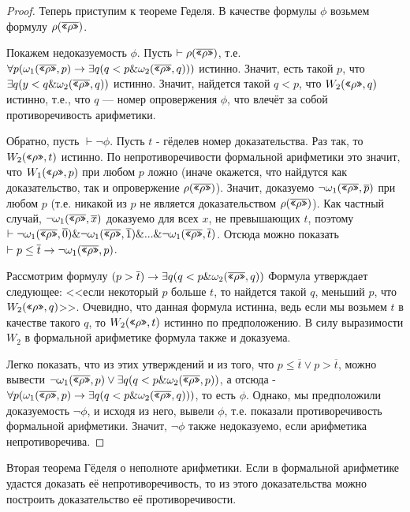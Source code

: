 \begin{proof}
Теперь приступим к теореме Геделя.
В качестве формулы $\phi$ возьмем формулу $\rho(\overline{\texttt{<<}\rho\texttt{>>}})$.

Покажем недоказуемость $\phi$. Пусть $\vdash \rho(\overline{\texttt{<<}\rho\texttt{>>}})$, 
т.е. $\forall p (\omega_1 (\overline{\texttt{<<}\rho\texttt{>>}},p) \rightarrow \exists q (q < p \& \omega_2 (\overline{\texttt{<<}\rho\texttt{>>}},q)))$
истинно. Значит, есть такой $p$, что $\exists q (y < q \& \omega_2 (\overline{\texttt{<<}\rho\texttt{>>}},q))$ истинно.
Значит, найдется такой $q < p$, что $W_2 (\texttt{<<}\rho\texttt{>>},q)$ истинно, т.е., что 
$q$ --- номер опровержения $\phi$, что влечёт за собой противоречивость арифметики.

Обратно, пусть $\vdash \neg \phi$. Пусть $t$ - гёделев номер доказательства.
Раз так, то $W_2 (\texttt{<<}\rho\texttt{>>},t)$ истинно. По непротиворечивости формальной арифметики
это значит, что $W_1 (\texttt{<<}\rho\texttt{>>},p)$ при любом $p$ ложно (иначе окажется, что 
найдутся как доказательство, так и опровержение $\rho(\overline{\texttt{<<}\rho\texttt{>>}})$). 
Значит, доказуемо $\neg \omega_1 (\overline{\texttt{<<}\rho\texttt{>>}},\overline{p})$ при 
любом $p$ (т.е. никакой из $p$ не является доказательством $\rho(\overline{\texttt{<<}\rho\texttt{>>}})$). 
Как частный случай, $\neg \omega_1 (\overline{\texttt{<<}\rho\texttt{>>}},\overline{x})$ доказуемо для
всех $x$, не превышающих $t$, поэтому 
$\vdash \neg \omega_1 (\overline{\texttt{<<}\rho\texttt{>>}},\overline{0}) \& \neg \omega_1 (\overline{\texttt{<<}\rho\texttt{>>}},\overline{1}) \& ... \& \neg \omega_1 (\overline{\texttt{<<}\rho\texttt{>>}},\overline{t})$.
Отсюда можно показать $\vdash p \le \overline{t} \rightarrow \neg \omega_1 (\overline{\texttt{<<}\rho\texttt{>>}},p)$.

Рассмотрим формулу $(p > \overline{t}) \rightarrow \exists q (q < p \& \omega_2 (\overline{\texttt{<<}\rho\texttt{>>}},q))$
Формула утверждает следующее: <<если некоторый $p$ больше $t$, то найдется
такой $q$, меньший $p$, что $W_2 (\texttt{<<}\rho\texttt{>>},q)$>>. Очевидно, что данная формула истинна,
ведь если мы возьмем $t$ в качестве такого $q$, то $W_2 (\texttt{<<}\rho\texttt{>>},t)$ истинно 
по предположению. В силу выразимости $W_2$ в формальной арифметике формула также и доказуема.

Легко показать, что из этих утверждений и из того, что $p \le \overline{t} \vee p > \overline{t}$,
можно вывести $\neg \omega_1 (\overline{\texttt{<<}\rho\texttt{>>}},p) \vee \exists q (q < p \& \omega_2 (\overline{\texttt{<<}\rho\texttt{>>}},p))$,
а отсюда - $\forall p (\omega_1 (\overline{\texttt{<<}\rho\texttt{>>}},p) \rightarrow \exists q (q < p \& \omega_2 (\overline{\texttt{<<}\rho\texttt{>>}},q)))$,
то есть $\phi$. Однако, мы предположили доказуемость $\neg \phi$, и исходя из него,
вывели $\phi$, т.е. показали противоречивость формальной арифметики. Значит, 
$\neg \phi$ также недоказуемо, если арифметика непротиворечива.
\end{proof}

\begin{theorem}{Вторая теорема Гёделя о неполноте арифметики.}
Если в формальной арифметике удастся доказать её непротиворечивость, то
из этого доказательства можно построить доказательство её противоречивости.
\end{theorem}

